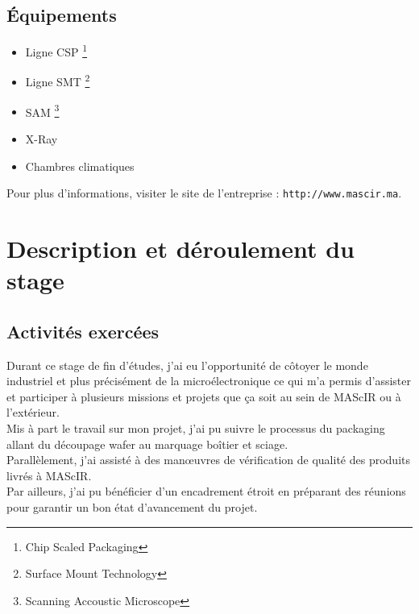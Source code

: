 \documentclass[11pt, a4paper, twoside]{book}
\begin{document}
\subsection{Équipements}
\begin{itemize}
\item Ligne CSP \footnote{Chip Scaled Packaging}
\item Ligne SMT \footnote{Surface Mount Technology}
\item SAM \footnote{Scanning Accoustic Microscope}
\item X-Ray
\item Chambres climatiques
\end{itemize}

Pour plus d'informations, visiter le site de l'entreprise : \texttt{http://www.mascir.ma}.

\section{Description et déroulement du stage}
\subsection{Activités exercées}
Durant ce stage de fin d’études, j’ai eu l’opportunité de côtoyer le monde industriel et plus précisément de la microélectronique ce qui m’a permis d’assister et participer à plusieurs missions et projets que ça soit au sein de MAScIR ou à l’extérieur.\\

Mis à part le travail sur mon projet, j’ai pu suivre le processus du packaging allant du découpage wafer au marquage boîtier et sciage.\\

Parallèlement, j’ai assisté à des manœuvres de vérification de qualité des produits livrés à MAScIR.\\

Par ailleurs, j’ai pu bénéficier d’un encadrement étroit en préparant des réunions pour garantir un bon état d’avancement du projet.
\end{document}
